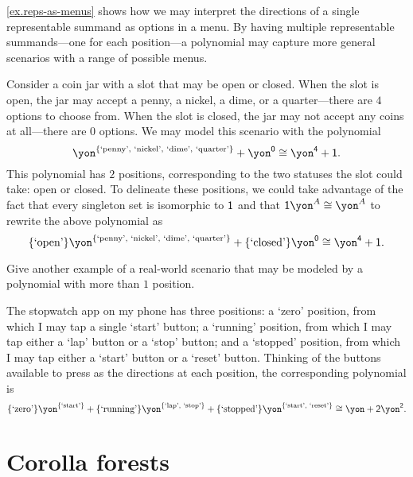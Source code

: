 \documentclass[Book-Poly]{subfiles}
\begin{document}
\cref{ex.reps-as-menus} shows how we may interpret the directions of a single representable summand as options in a menu.
By having multiple representable summands---one for each position---a polynomial may capture more general scenarios with a range of possible menus.

\begin{example} \label{ex.coin-jar}
    Consider a coin jar with a slot that may be open or closed.
    When the slot is open, the jar may accept a penny, a nickel, a dime, or a quarter---there are $4$ options to choose from.
    When the slot is closed, the jar may not accept any coins at all---there are $0$ options.
    We may model this scenario with the polynomial
    \[
        \yon^{\{\text{`penny', `nickel', `dime', `quarter'}\}}+\yon^\0 \iso \yon^\4+\1.
    \]
    This polynomial has $2$ positions, corresponding to the two statuses the slot could take: open or closed.
    To delineate these positions, we could take advantage of the fact that every singleton set is isomorphic to $\textsf{1}$ and that $\1\yon^A\iso\yon^A$ to rewrite the above polynomial as
    \[
        \{\text{`open'}\}\yon^{\{\text{`penny', `nickel', `dime', `quarter'}\}}+\{\text{`closed'}\}\yon^\0 \iso \yon^\4+\1.
    \]
\end{example}

\begin{exercise}
    Give another example of a real-world scenario that may be modeled by a polynomial with more than $1$ position.
\begin{solution}
    The stopwatch app on my phone has three positions: a `zero' position, from which I may tap a single `start' button; a `running' position, from which I may tap either a `lap' button or a `stop' button; and a `stopped' position, from which I may tap either a `start' button or a `reset' button. Thinking of the buttons available to press as the directions at each position, the corresponding polynomial is
    \[
        \{\text{`zero'}\}\yon^{\{\text{`start'}\}}+\{\text{`running'}\}\yon^{\{\text{`lap', `stop'}\}}+\{\text{`stopped'}\}\yon^{\{\text{`start', `reset'}\}}\iso\yon+\2\yon^\2.
    \]
\end{solution}
\end{exercise}


\section{Corolla forests}
\end{document}
